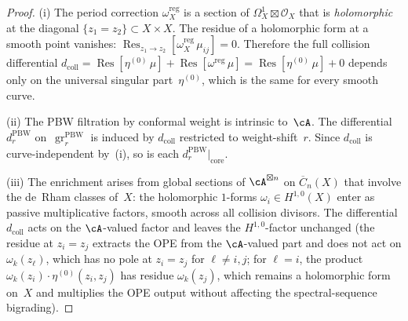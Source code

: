 \begin{proof}
(i) The period correction
$\omega_X^{\mathrm{reg}}$ is a section of
$\Omega^1_X \boxtimes \mathcal{O}_X$ that is
\emph{holomorphic} at the diagonal
$\{z_1 = z_2\} \subset X \times X$.
The residue of a holomorphic form at a smooth point
vanishes:
$\operatorname{Res}_{z_1 \to z_2}
[\omega_X^{\mathrm{reg}}\, \mu_{ij}] = 0$.
Therefore the full collision differential
$d_{\mathrm{coll}} =
\operatorname{Res}[\eta^{(0)}\,\mu]
+ \operatorname{Res}[\omega^{\mathrm{reg}}\,\mu]
= \operatorname{Res}[\eta^{(0)}\,\mu] + 0$
depends only on the universal singular part~$\eta^{(0)}$,
which is the same for every smooth curve.

(ii) The PBW filtration by conformal weight is intrinsic
to~$\cA$.  The differential $d_r^{\mathrm{PBW}}$
on~$\operatorname{gr}^{\mathrm{PBW}}_r$ is induced by
$d_{\mathrm{coll}}$ restricted to weight-shift~$r$.
Since $d_{\mathrm{coll}}$ is curve-independent by~(i),
so is each $d_r^{\mathrm{PBW}}\big|_{\mathrm{core}}$.

(iii) The enrichment arises from global sections of
$\cA^{\boxtimes n}$ on
$\overline{C}_n(X)$ that involve the de~Rham classes
of~$X$: the holomorphic $1$-forms
$\omega_i \in H^{1,0}(X)$ enter as passive
multiplicative factors, smooth across all collision
divisors.  The differential $d_{\mathrm{coll}}$ acts
on the $\cA$-valued factor and leaves the
$H^{1,0}$-factor unchanged (the residue at
$z_i = z_j$ extracts the OPE from the
$\cA$-valued part and does not act on
$\omega_k(z_\ell)$, which has no pole at $z_i = z_j$
for $\ell \neq i,j$; for $\ell = i$, the product
$\omega_k(z_i) \cdot \eta^{(0)}(z_i,z_j)$ has
residue $\omega_k(z_j)$, which remains a
holomorphic form on~$X$ and multiplies the
OPE output without affecting the spectral-sequence
bigrading).
\end{proof}

